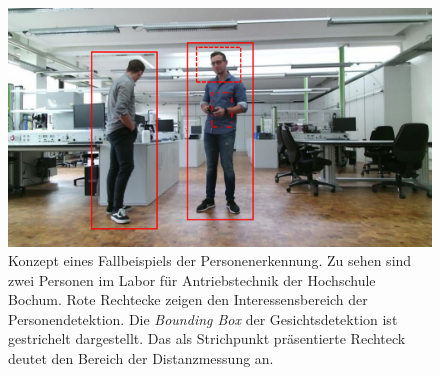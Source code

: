 	
	
	\begin{figure}[H]
		\centering
		\includegraphics[width=1\textwidth]{Bilder/person.pdf}
		\caption{Konzept eines Fallbeispiels der Personenerkennung. Zu sehen sind zwei Personen im Labor für Antriebstechnik der Hochschule Bochum. Rote Rechtecke zeigen den Interessensbereich der Personendetektion. Die \textit{Bounding Box} der Gesichtsdetektion ist gestrichelt dargestellt. Das als Strichpunkt präsentierte Rechteck deutet den Bereich der Distanzmessung an.}
		\label{fig: bbox}
	\end{figure}

	
		
	
		
